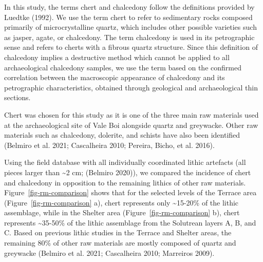 \documentclass[
  a4paper,
  DIV=11,
  numbers=noendperiod]{scrreprt}
\begin{document}
In this study, the terms chert and chalcedony follow the definitions
provided by Luedtke (1992). We use the term chert to refer to
sedimentary rocks composed primarily of microcrystalline quartz, which
includes other possible varieties such as jasper, agate, or chalcedony.
The term chalcedony is used in its petrographic sense and refers to
cherts with a fibrous quartz structure. Since this definition of
chalcedony implies a destructive method which cannot be applied to all
archaeological chalcedony samples, we use the term based on the
confirmed correlation between the macroscopic appearance of chalcedony
and its petrographic characteristics, obtained through geological and
archaeological thin sections.

Chert was chosen for this study as it is one of the three main raw
materials used at the archaeological site of Vale Boi alongside quartz
and greywacke. Other raw materials such as chalcedony, dolerite, and
schists have also been identified (Belmiro et al. 2021; Cascalheira
2010; Pereira, Bicho, et al. 2016).

Using the field database with all individually coordinated lithic
artefacts (all pieces larger than \textasciitilde2 cm; (Belmiro 2020)),
we compared the incidence of chert and chalcedony in opposition to the
remaining lithics of other raw materials. Figure~\ref{fig-rm-comparison}
shows that for the selected levels of the Terrace area
(Figure~\ref{fig-rm-comparison} a), chert represents only
\textasciitilde15-20\% of the lithic assemblage, while in the Shelter
area (Figure~\ref{fig-rm-comparison} b), chert represents
\textasciitilde35-50\% of the lithic assemblage from the Solutrean
layers A, B, and C. Based on previous lithic studies in the Terrace and
Shelter areas, the remaining 80\% of other raw materials are mostly
composed of quartz and greywacke (Belmiro et al. 2021; Cascalheira 2010;
Marreiros 2009).
\end{document}
